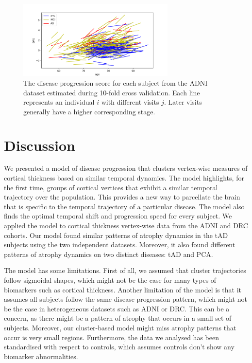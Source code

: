 \documentclass{llncs}
\begin{document}
\begin{figure}[h]
    \centering
    \includegraphics[width=0.7\textwidth, trim=0 10 0 100]{figures/crossvalid/stagingConsistWide_adniThavgFWHM0Initk-meansCl3Pr0Ra1_VWDPMMean.png}
    \caption{The disease progression score for each subject from the ADNI dataset estimated during 10-fold cross validation. Each line represents an individual $i$ with different visits $j$. Later visits generally have a higher corresponding stage.}
    \label{fig:stagingConsist}
\end{figure}

\section{Discussion}

We presented a model of disease progression that clusters vertex-wise measures of cortical thickness based on similar temporal dynamics. The model highlights, for the first time, groups of cortical vertices that exhibit a similar temporal trajectory over the population. This provides a new way to parcellate the brain that is specific to the temporal trajectory of a particular disease. The model also finds the optimal temporal shift and progression speed for every subject. We applied the model to cortical thickness vertex-wise data from the ADNI and DRC cohorts. Our model found similar patterns of atrophy dynamics in the tAD subjects using the two independent datasets. Moreover, it also found different patterns of atrophy dynamics on two distinct diseases: tAD and PCA. 

The model has some limitations. First of all, we assumed that cluster trajectories follow sigmoidal shapes, which might not be the case for many types of biomarkers such as cortical thickness. Another limitation of the model is that it assumes all subjects follow the same disease progression pattern, which might not be the case in heterogeneous datasets such as ADNI or DRC. This can be a concern, as there might be a pattern of atrophy that occurs in a small set of subjects. Moreover, our cluster-based model might miss atrophy patterns that occur is very small regions. Furthermore, the data we analysed has been standardised with respect to controls, which assumes controls don't show any biomarker abnormalities.
\end{document}
